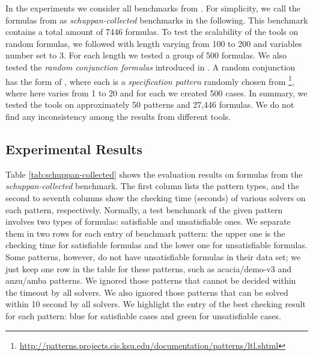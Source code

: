 \documentclass[conference]{IEEEtran}
\begin{document}
In the experiments we consider all benchmarks from \cite{RV10,SD11,LZPVH13}.
For simplicity, we call the formulas from \cite{SD11} as 
\textit{schuppan-collected} benchmarks in the following. This benchmark 
contains a total amount of 7446 formulas. To test the scalability of the 
tools on random formulas, we followed \cite{RV10} with length varying from 
100 to 200 and variables number set to 3. For each length we tested a group
of 500 formulas.  We also tested the \textit{random conjunction formulas} 
introduced in \cite{LZPVH13}. A random conjunction has the form of 
, where each  is a 
\emph{specification pattern} randomly chosen from \cite{DAC98}\footnote{\url{http://patterns.projects.cis.ksu.edu/documentation/patterns/ltl.shtml}},
where  here varies from 1 to 20 and for each  we created 500 cases. 
In summary, we tested the tools on approximately 50 patterns and 27,446 
formulas. We do not find any inconsistency among the results from different
tools.

\subsection{Experimental Results}

\iffalse
\begin{figure}[t]
\begin{minipage}[b]{0.45\linewidth}
\centering
\texttt{[image: random]}
\caption{Experimental results on extended random formulas with 3 variables.}
\label{fig:random}
\end{minipage}
\hspace{0.6cm}
\begin{minipage}[b]{0.45\linewidth}
\centering
\texttt{[image: random\_conjunction]}
\caption{Experimental results on random conjunction formulas.}
\label{fig:random_conjunction}
\vspace{0.3cm}
\end{minipage}
\end{figure}
\fi





Table \ref{tab:schuppan-collected} shows the evaluation results on 
formulas from the \textit{schuppan-collected} benchmark.
The first column lists the pattern types, and the second to seventh columns
show the checking time (seconds) of various solvers on each pattern, 
respectively.  Normally, a test benchmark of the given pattern involves two
types of formulas: satisfiable and unsatisfiable ones. We separate them in 
two rows for each entry of benchmark pattern: the upper one is the
checking time for satisfiable formulas and the lower one for
unsatisfiable formulas. Some patterns, however, do not have
unsatisfiable formulas in their data set; we just keep one row in the
table for these patterns, such as \textsf{acacia/demo-v3} and
\textsf{anzu/amba} patterns. We ignored those patterns that cannot 
be decided within the timeout by all solvers.  We also ignored those 
patterns that can be solved within 10 second by all solvers.
We highlight the entry of the best checking result for each pattern: 
blue for satisfiable cases and green for unsatisfiable cases. 
\end{document}
